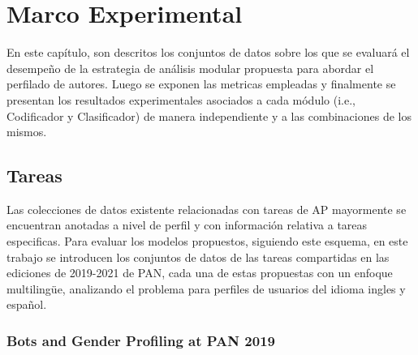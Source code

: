 \chapter{Marco Experimental}

En este capítulo, son descritos los conjuntos de datos sobre los que se evaluará el desempeño de la estrategia de análisis modular propuesta para abordar el perfilado de autores. Luego se exponen las metricas empleadas y finalmente se presentan los resultados experimentales asociados a cada módulo (i.e., Codificador y Clasificador) de manera independiente y a las combinaciones de los mismos.
	
\section{Tareas}
	 
	 Las colecciones de datos existente relacionadas con tareas de AP mayormente se encuentran anotadas a nivel de perfil y con información relativa a tareas especificas. Para evaluar los modelos propuestos, siguiendo este esquema, en este trabajo se introducen los conjuntos de datos de las tareas compartidas en las ediciones de 2019-2021 de PAN, cada una de estas propuestas con un enfoque multilingüe, analizando el problema para perfiles de usuarios del idioma ingles y español.
	 
	 \subsection{Bots and Gender Profiling at PAN 2019}
	 

